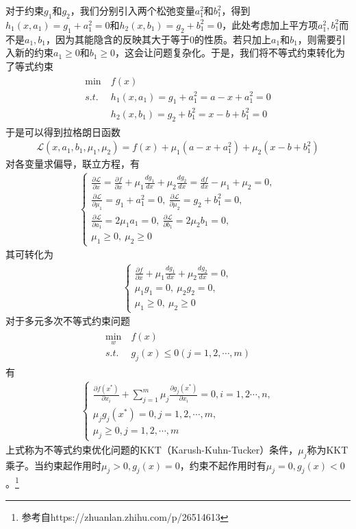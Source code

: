 对于约束$g_1$和$g_2$，我们分别引入两个松弛变量$a_1^2$和$b_1^2$，得到$h_1(x,a_1)=g_1+a_1^2=0$和$h_2(x,b_1)=g_2+b_1^2=0$，此处考虑加上平方项$a_1^2,b_1^2$而不是$a_1,b_1$，因为其能隐含的反映其大于等于0的性质。若只加上$a_1$和$b_1$，则需要引入新的约束$a_1\geq 0$和$b_1\geq 0$，这会让问题复杂化。于是，我们将不等式约束转化为了等式约束
\begin{eqnarray}
\begin{aligned}
\min &\ f(x)\\
s.t. &\ h_1(x,a_1)=g_1+a_1^2=a-x+a_1^2=0\\
&\ h_2(x,b_1)=g_2+b_1^2=x-b+b_1^2=0
\end{aligned}
\end{eqnarray}
于是可以得到拉格朗日函数
\begin{eqnarray}
\mathcal{L}(x,a_1,b_1,\mu_1,\mu_2)=f(x)+\mu_1(a-x+a_1^2)+\mu_2(x-b+b_1^2)
\end{eqnarray}
对各变量求偏导，联立方程，有
\begin{eqnarray}
\left\lbrace
\begin{aligned}
\frac{\partial \mathcal{L}}{\partial x}=\frac{\partial f}{\partial x}+\mu_1\frac{dg_1}{dx}+\mu_2\frac{dg_2}{dx}=\frac{df}{dx}-\mu_1+\mu_2=0,\\
\frac{\partial \mathcal{L}}{\partial \mu_1}=g_1+a_1^2=0,\ \frac{\partial \mathcal{L}}{\partial \mu_2}=g_2+b_1^2=0,\\
\frac{\partial \mathcal{L}}{\partial a_1}=2\mu_1a_1=0,\ 
\frac{\partial \mathcal{L}}{\partial b_1}=2\mu_2b_1=0,\\
\mu_1\geq 0,\ \mu_2\geq 0
\end{aligned}
\right.
\end{eqnarray}
其可转化为
\begin{eqnarray}
\left\lbrace
\begin{aligned}
\frac{\partial f}{\partial x}+\mu_1\frac{dg_1}{dx}+\mu_2\frac{dg_2}{dx}=0,\\
\mu_1g_1=0,\ \mu_2g_2=0,\\
\mu_1\geq 0,\ \mu_2\geq 0
\end{aligned}
\right.
\end{eqnarray}
对于多元多次不等式约束问题
\begin{eqnarray}
\begin{aligned}
\min_w &\ f(x)\\
s.t.&\  g_j(x)\leq0(j=1,2,\cdots,m)
\end{aligned}
\end{eqnarray}
有
\begin{eqnarray}
\left\lbrace
\begin{aligned}
\frac{\partial f(x^*)}{\partial x_i}+\sum_{j=1}^m\mu_j\frac{\partial g_j(x^*)}{\partial x_i}=0, i=1,2\cdots,n,\\
\mu_jg_j(x^*)=0, j=1,2,\cdots,m,\\
\mu_j\geq 0,j=1,2,\cdots,m
\end{aligned}
\right.
\end{eqnarray}
上式称为不等式约束优化问题的KKT（Karush-Kuhn-Tucker）条件，$\mu_j$称为KKT乘子。当约束起作用时$\mu_j> 0,g_j(x)=0$，约束不起作用时有$\mu_j= 0,g_j(x)<0$。\footnote{参考自https://zhuanlan.zhihu.com/p/26514613}

